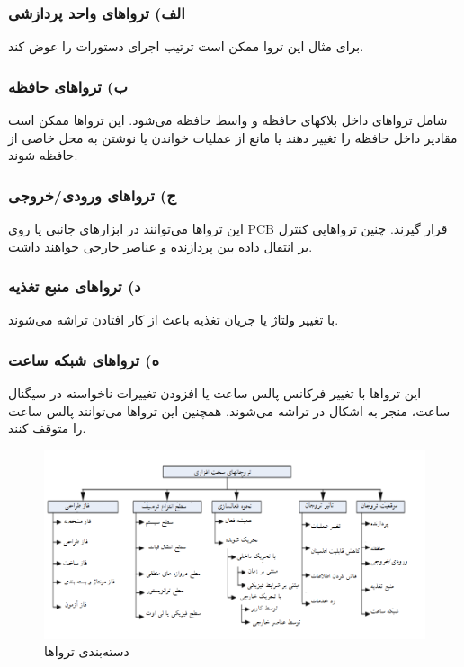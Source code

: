 \subsubsection {الف) تروا‌های واحد پردازشی}  برای مثال این تروا ممکن است ترتیب اجرای دستورات را عوض کند.
\subsubsection {ب) تروا‌های حافظه} شامل تروا‌های داخل بلاکهای حافظه و واسط حافظه می‌شود. این تروا‌ها ممکن است مقادیر داخل حافظه را تغییر دهند یا مانع از عملیات خواندن یا نوشتن به محل خاصی از حافظه شوند.
\subsubsection {ج) تروا‌های ورودی/خروجی} این تروا‌ها می‌توانند در ابزارهای جانبی یا روی PCB قرار گیرند. چنین تروا‌هایی کنترل بر انتقال داده بین پردازنده و عناصر خارجی خواهند داشت.
\subsubsection {د) تروا‌های منبع تغذیه}  با تغییر ولتاژ یا جریان تغذیه باعث از کار افتادن تراشه می‌شوند.
\subsubsection {ه) تروا‌های شبکه ساعت}  این تروا‌ها با تغییر فرکانس پالس ساعت یا افزودن تغییرات ناخواسته در سیگنال ساعت، منجر به اشکال در تراشه می‌شوند. همچنین این تروا‌ها می‌توانند پالس ساعت را متوقف کنند.

\begin{figure}
	\begin{center}
		\includegraphics[scale=.7]{figs/fig1-2.png}
		\caption{دسته‌بندی ترواها}
		\label{figtax}
	\end{center}
\end{figure}


